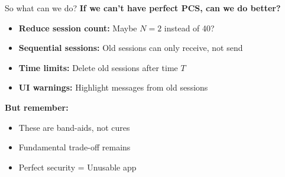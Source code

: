 \ifdefined\PRESENTATION\else\PassOptionsToClass{handout}{beamer}\fi\documentclass[aspectratio=169, lualatex]{beamer}
\begin{document}
\begin{frame}{So what can we do?}
	\textbf{If we can't have perfect PCS, can we do better?}
	\begin{itemize}
		\item \textbf{Reduce session count:} Maybe $N = 2$ instead of 40?
		\item \textbf{Sequential sessions:} Old sessions can only receive, not send
		\item \textbf{Time limits:} Delete old sessions after time $T$
		\item \textbf{UI warnings:} Highlight messages from old sessions
	\end{itemize}
	\textbf{But remember:}
	\begin{itemize}
		\item These are band-aids, not cures
		\item Fundamental trade-off remains
		\item Perfect security = Unusable app
	\end{itemize}
\end{frame}
\end{document}
